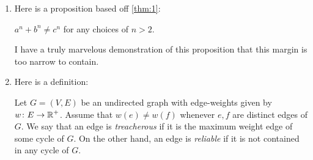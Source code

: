 \documentclass{article}
\begin{document}
\begin{enumerate}
  \item \label{qst:6}
    Here is a proposition based off \autoref{thm:1}:
    \begin{proposition}\label{prop:1}
      $a^n + b^n \neq c^n$ for any choices of $n > 2$.
    \end{proposition}
    \begin{proof*}
      I have a truly marvelous demonstration of this proposition that
      this margin is too narrow to contain.
    \end{proof*}

  \item \label{qst:7}
    Here is a definition:
    \begin{definition}
      Let $G = (V, E)$ be an undirected graph with edge-weights given
      by $w \colon E \rightarrow \operatorname*{\mathbb{R}}^+$. Assume that $w(e) \neq w(f)$
      whenever $e, f$ are distinct edges of $G$. We say that an edge
      is {\it treacherous} if it is the maximum weight edge of some cycle
      of $G$. On the other hand, an edge is {\it reliable} if it is not
      contained in any cycle of $G$.
    \end{definition}
\end{enumerate}
\end{document}
